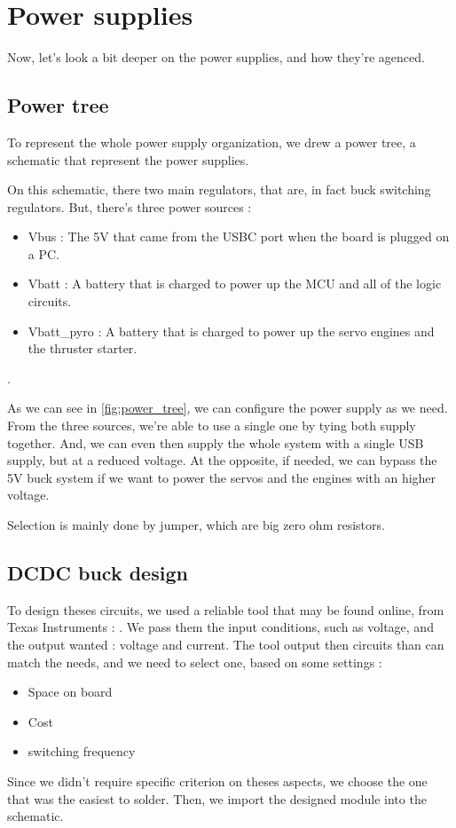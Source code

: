 \section{Power supplies}
Now, let's look a bit deeper on the power supplies, and how they're agenced.
\subsection{Power tree}
To represent the whole power supply organization, we drew a power tree, a schematic that
represent the power supplies.



On this schematic, there two main regulators, that are, in fact buck switching regulators.
But, there's three power sources :
\begin{itemize}
    \item   Vbus : The 5V that came from the USBC port when the board is plugged on a PC.
    \item   Vbatt : A battery that is charged to power up the MCU and all of the logic
          circuits.
    \item   Vbatt\_pyro : A battery that is charged to power up the servo engines and
          the thruster starter.
\end{itemize}.

As we can see in \ref{fig:power_tree}, we can configure the power supply as we need.
From the three sources, we're able to use a single one by tying both supply together.
And, we can even then supply the whole system with a single USB supply, but at a reduced
voltage. At the opposite, if needed, we can bypass the 5V buck system if we want to
power the servos and the engines with an higher voltage.

Selection is mainly done by jumper, which are big zero ohm resistors.

\subsection{DCDC buck design}
To design theses circuits, we used a reliable tool that may be found online, from
Texas Instruments : \cite{POWERDESIGNER}. We pass them the input conditions, such as
voltage, and the output wanted : voltage and current. The tool output then circuits
than can match the needs, and we need to select one, based on some settings :

\begin{itemize}
    \item   Space on board
    \item   Cost
    \item   switching frequency
\end{itemize}

Since we didn't require specific criterion on theses aspects, we choose the one that
was the easiest to solder. Then, we import the designed module into the schematic.
